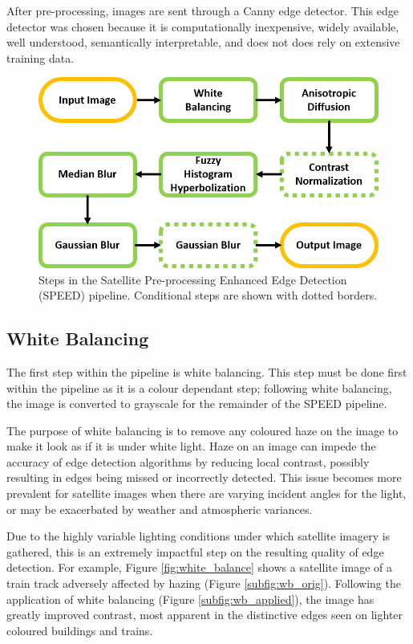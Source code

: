 \documentclass[conference]{IEEEtran}
\begin{document}
After pre-processing, images are sent through a Canny edge detector. This edge detector was chosen because it is computationally inexpensive, widely available, well understood, semantically interpretable, and does not does rely on extensive training data.  

\begin{figure}
\centerline{\includegraphics[width=\linewidth]{pipeline.png}}
\caption{Steps in the Satellite Pre-processing Enhanced Edge Detection (SPEED) pipeline. Conditional steps are shown with dotted borders.}
\label{fig:sys_model}
\end{figure}

\subsection{White Balancing}
\label{subsec:WB}

The first step within the pipeline is white balancing. This step must be done first within the pipeline as it is a colour dependant step; following white balancing, the image is converted to grayscale for the remainder of the SPEED pipeline. 

The purpose of white balancing is to remove any coloured haze on the image to make it look as if it is under white light. Haze on an image can impede the accuracy of edge detection algorithms by reducing local contrast, possibly resulting in edges being missed or incorrectly detected. This issue becomes more prevalent for satellite images when there are varying incident angles for the light, or may be exacerbated by weather and atmospheric variances. 

Due to the highly variable lighting conditions under which satellite imagery is gathered, this is an extremely impactful step on the resulting quality of edge detection. For example, Figure \ref{fig:white_balance} shows a satellite image of a train track adversely affected by hazing (Figure \ref{subfig:wb_orig}). Following the application of white balancing (Figure \ref{subfig:wb_applied}), the image has greatly improved contrast, most apparent in the distinctive edges seen on lighter coloured buildings and trains.
\end{document}
